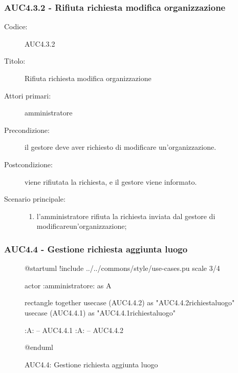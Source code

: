 \documentclass[casi-duso]{subfiles}
\begin{document}
\subsubsection{AUC4.3.2 - Rifiuta richiesta modifica organizzazione}%
\label{subsub:AUC4.3.2}
\begin{description}
  \item[Codice:] AUC4.3.2
  \item[Titolo:] Rifiuta richiesta modifica organizzazione
  \item[Attori primari:] amministratore
  \item[Precondizione:] il gestore deve aver richiesto di modificare un'organizzazione.
  \item[Postcondizione:] viene rifiutata la richiesta, e il gestore viene informato.
  \item[Scenario principale:]
  \begin{enumerate}
    \item l'amministratore rifiuta la richiesta inviata dal gestore di modificareun'organizzazione;
  \end{enumerate}
\end{description}

\subsubsection{AUC4.4 - Gestione richiesta aggiunta luogo}%
\label{subsub:AUC4.4}

\begin{figure}[h!] 
  \centering 
  \begin{plantuml}
  @startuml
  !include ../../commons/style/use-cases.pu
  scale 3/4

  actor :amministratore: as A

  rectangle {
    together {
      usecase (AUC4.4.2) as "AUC4.4.2\nRifiuta richiesta\naggiungi luogo"
      usecase (AUC4.4.1) as "AUC4.4.1\nAccetta richiesta\naggiungi luogo"
    }
  }

  :A: -- AUC4.4.1
  :A: -- AUC4.4.2

  @enduml
  \end{plantuml} 
  \caption{AUC4.4: Gestione richiesta aggiunta luogo} 
  \label{fig:auc4_4} 
\end{figure}
\end{document}
